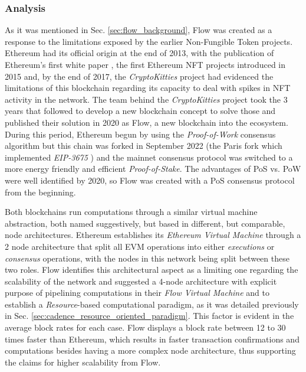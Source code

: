 \documentclass[../main.tex]{subfiles}
\begin{document}
\subsubsection{Analysis}
As it was mentioned in Sec. \ref{sec:flow_background}, Flow was created as a response to the limitations exposed by the earlier Non-Fungible Token projects. Ethereum had its official origin at the end of 2013, with the publication of Ethereum's first white paper \cite{Buterin2014}, the first Ethereum NFT projects introduced in 2015 and, by the end of 2017, the \textit{CryptoKitties} project had evidenced the limitations of this blockchain regarding its capacity to deal with spikes in NFT activity in the network. The team behind the \textit{CryptoKitties} project took the 3 years that followed to develop a new blockchain concept to solve those and published their solution in 2020 as Flow, a new blockchain into the ecosystem. During this period, Ethereum begun by using the \textit{Proof-of-Work} consensus algorithm but this chain was forked in September 2022 (the Paris fork which implemented \textit{EIP-3675} \cite{EIP3675}) and the mainnet consensus protocol was switched to a more energy friendly and efficient \textit{Proof-of-Stake}. The advantages of PoS vs. PoW were well identified by 2020, so Flow was created with a PoS consensus protocol from the beginning.
\par
Both blockchains run computations through a similar virtual machine abstraction, both named suggestively, but based in different, but comparable, node architectures. Ethereum establishes its \textit{Ethereum Virtual Machine} through a 2 node architecture that split all EVM operations into either \textit{executions} or \textit{consensus} operations, with the nodes in this network being split between these two roles. Flow identifies this architectural aspect as a limiting one regarding the scalability of the network and suggested a 4-node architecture with explicit purpose of pipelining computations in their \textit{Flow Virtual Machine} and to establish a \textit{Resource}-based computational paradigm, as it was detailed previously in Sec. \ref{sec:cadence_resource_oriented_paradigm}. This factor is evident in the average block rates for each case. Flow displays a block rate between 12 to 30 times faster than Ethereum, which results in faster transaction confirmations and computations besides having a more complex node architecture, thus supporting the claims for higher scalability from Flow.
\par
\end{document}
